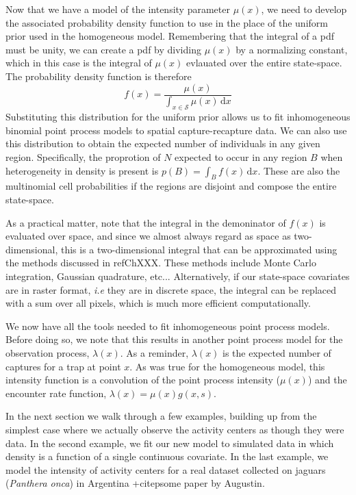 Now that we have a model of the intensity parameter $\mu(x)$,
we need to develop the associated probability density function to use
in the place of the uniform prior used in the homogeneous
model. Remembering that
the integral of a pdf must be unity, we can create a pdf by dividing
$\mu(x)$ by a normalizing constant, which in this case is the integral
of $\mu(x)$ evlauated over the entire
state-space. The probability density function is therefore
\begin{equation}
f(x) = \frac{\mu(x)}{\int_{x \in \mathcal{S}} \mu(x)\, \mathrm{d}x}
\label{eq:pdf-ipp}
\end{equation}
Substituting this distribution for the
uniform prior allows us to fit inhomogeneous binomial point process
models to spatial capture-recapture data. We can also use this
distribution to obtain the expected number of individuals in any given
region. Specifically, the proprotion of $N$ expected to occur in any
region $B$ when heterogeneity in density is present is $p(B) = \int_B
f(x)\, \mathrm{d}x$. These are
also the multinomial cell probabilities if the regions are
disjoint and compose the entire state-space.

As a practical matter, note that the integral in the
demoninator of $f(x)$ is evaluated over space, and since we almost always regard as
space as two-dimensional, this is a two-dimensional integral that can
be approximated using the methods discussed in ref{ChXXX}. These methods include
Monte Carlo integration, Gaussian quadrature, etc... Alternatively, if
our state-space covariates are in raster format, \emph{i.e} they are
in discrete space, the integral can be replaced with a sum over
all pixels, which is much more efficient
computationally.

We now have all the tools needed to fit inhomogeneous point process
models. Before doing so, we note that this results in another point
process model for the
observation process, $\lambda(x)$. As
a reminder, $\lambda(x)$ is the expected number of captures for a trap
at point $x$. As was true for the homogeneous model, this
intensity function is a convolution of the point process intensity
($\mu(x)$) and the encounter rate function,
$\lambda(x) = \mu(x) g(x,s)$.

In the next section we walk through a few examples, building up from
the simplest case where we actually observe the activity centers as
though they were data. In the second example, we fit our new model to simulated
data in which density is a function of a single continuous
covariate. In the last example, we model the intensity of activity
centers for a real dataset collected on jaguars (\emph{Panthera onca})
in Argentina +citep{some paper by Augustin}.

